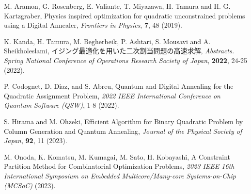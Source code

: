 \documentclass[submit,techrep,noauthor]{ipsj}
\begin{document}
\begin{thebibliography}{10}
M. Aramon, G. Rosenberg, E. Valiante, T. Miyazawa, H. Tamura and H. G. Kartzgraber, Physics inspired optimization for quadratic unconstrained problems using a Digital Annealer, {\it Frontiers in Physics}, {\bf 7}, 48 (2019).

K. Kanda, H. Tamura, M. Begherbeik, P. Ashtari, S. Mousavi and A. Sheikholeslami, イジング最適化を用いた二次割当問題の高速求解, {\it Abstracts. Spring National Conference of Operations Research Society of Japan}, {\bf 2022}, 24-25 (2022).

P. Codognet, D. Diaz, and S. Abreu, Quantum and Digital Annealing for the Quadratic Assignment Problem, {\it 2022 IEEE International Conference on Quantum Software (QSW)}, 1-8 (2022).

S. Hirama and M. Ohzeki, Efficient Algorithm for Binary Quadratic Problem by Column Generation and Quantum Annealing, {\it Journal of the Physical Society of Japan}, {\bf 92}, 11 (2023).

M. Onoda, K. Komatsu, M. Kumagai, M. Sato, H. Kobayashi, A Constraint Partition Method for Combinatorial Optimization Problems, {\it 2023 IEEE 16th International Symposium on Embedded Multicore/Many-core Systems-on-Chip (MCSoC)} (2023).

\end{thebibliography}
\end{document}
